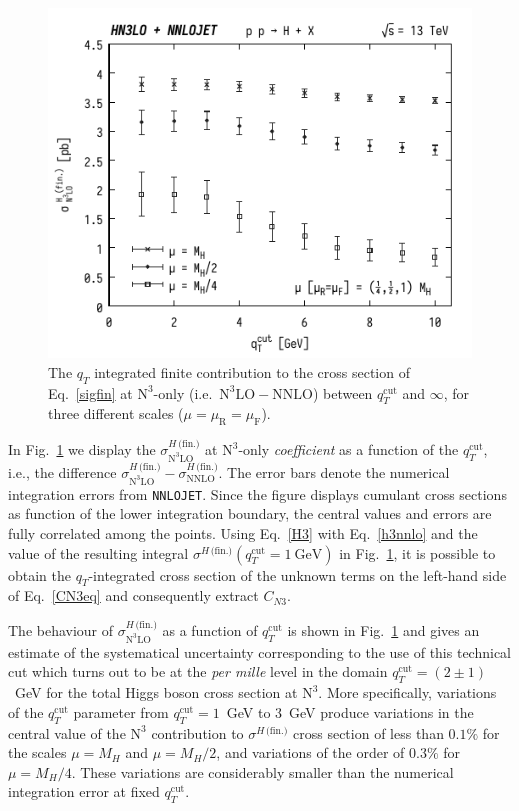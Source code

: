 \documentclass[12pt]{article}
\DeclareRobustCommand{\mur}{\ensuremath{\mu_{\mathrm{R}}}\xspace}
\DeclareRobustCommand{\muR}{\mur}
\DeclareRobustCommand{\muf}{\ensuremath{\mu_{\mathrm{F}}}\xspace}
\DeclareRobustCommand{\muF}{\muf}
\DeclareRobustCommand{\qt}{\ensuremath{q_T}\xspace}
\DeclareRobustCommand{\qtcut}{\ensuremath{q_T^\mathrm{cut}}\xspace}
\DeclareRobustCommand{\fin}{\text{(fin.)}\xspace}
\DeclareRobustCommand{\LO}{\text{LO}\xspace}
\DeclareRobustCommand{\NNLO}{\text{NNLO}\xspace}
\DeclareRobustCommand{\N}[1]{\ensuremath{\text{N}^{#1}}} %
\begin{document}
\begin{figure}[tb]
\centering
\includegraphics[width=.6\linewidth]{./new_figures/finN3LO}
\caption{\label{fig:finiten3lo}{The $\qt$ integrated finite contribution to the cross section of Eq.~\eqref{sigfin} at \N3\LO-only (i.e.\ $\N3\LO-\NNLO$) between $\qtcut$ and $\infty$, for three different scales ($\mu=\muR=\muF$).}}
\end{figure}

In Fig.~\ref{fig:finiten3lo} we display the $\sigma^{H\,\fin}_{\N3\LO}$ at \N3\LO-only \emph{coefficient} as a function of the $\qtcut$, i.e.,  the difference $\sigma^{H\,\fin}_{\N3\LO} - \sigma^{H\,\fin}_{\NNLO}$. 
The error bars denote the numerical integration errors from  \texttt{NNLOJET}. Since the figure displays cumulant cross sections as function of the lower integration boundary, the central values and errors are fully correlated among the points.
Using Eq.~\eqref{H3} with Eq.~\eqref{h3nnlo} and the value of the resulting integral $ \sigma^{H\,\fin}(\qtcut=1~\mathrm{GeV})$ in Fig.~\ref{fig:finiten3lo}, it is possible to obtain the $\qt$-integrated cross section of the unknown terms on the left-hand side of Eq.~\eqref{CN3eq} and consequently extract $C_{N3}$. 

The behaviour of $\sigma^{H\,\fin}_{\N3\LO}$ as a function of $\qtcut$ is shown in Fig.~\ref{fig:finiten3lo} and gives an estimate of the systematical uncertainty corresponding to the use of this technical cut which turns out to be at the \textit{per mille} level in the domain $\qtcut=(2\pm 1)$~GeV for the total Higgs boson cross section at \N3\LO. More specifically, variations of the $\qtcut$ parameter from $\qtcut=1$~GeV to 3~GeV produce variations in the central value of the 
\N3\LO contribution to $\sigma^{H\,\fin}$ cross section of less than $0.1\%$ for the scales $\mu=M_{H}$ and $\mu=M_{H}/2$, and variations of the order of $0.3\%$ for $\mu=M_{H}/4$. These variations are considerably smaller than the numerical integration error at fixed $\qtcut$. 
\end{document}
